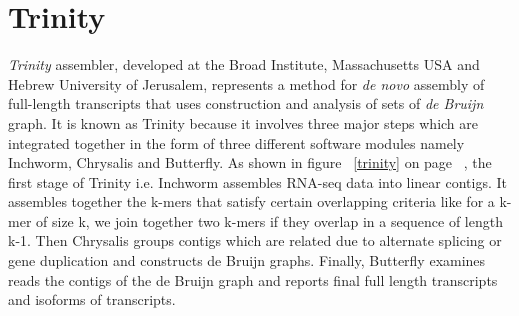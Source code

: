 \label{key}\documentclass[bachinf, english ,zihtitle,final,hyperref,utf8]{zihpub}
\begin{document}
\section{Trinity}
\emph{Trinity} assembler, developed at the Broad Institute, Massachusetts USA and Hebrew University of Jerusalem, represents a method for \emph{de novo} assembly of full-length transcripts that uses construction and analysis of sets of \emph{de Bruijn} graph. It is known as Trinity because it involves three major steps which are integrated together in the form of three different software modules namely Inchworm, Chrysalis and Butterfly. As shown in figure ~\ref{trinity} on page ~\pageref{trinity}, the first stage of Trinity i.e. Inchworm assembles RNA-seq data into linear contigs. It assembles together the k-mers that satisfy certain overlapping criteria like for a k-mer of size k, we join together two k-mers if they overlap in a sequence of length k-1. Then Chrysalis groups contigs which are related due to alternate splicing or gene duplication and constructs de Bruijn graphs. Finally, Butterfly examines reads the contigs of the de Bruijn graph and reports final full length transcripts and isoforms of transcripts.
\end{document}
